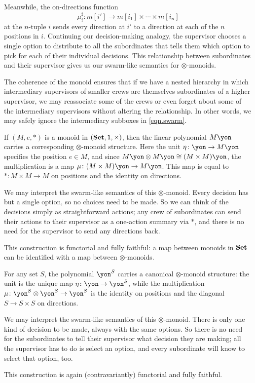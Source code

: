 \documentclass[Book-Poly]{subfiles}
\begin{document}
Meanwhile, the on-directions function
\[
    \mu^\sharp_{i} \colon m[i'] \to m[i_1]\times\cdots\times m[i_n]
\] 
at the $n$-tuple $i$ sends every direction at $i'$ to a direction at each of the $n$ positions in $i$.
Continuing our decision-making analogy, the supervisor chooses a single option to distribute to all the subordinates that tells them which option to pick for each of their individual decisions.
This relationship between subordinates and their supervisor gives us our swarm-like semantics for $\otimes$-monoids.

The coherence of the monoid ensures that if we have a nested hierarchy in which intermediary supervisors of smaller crews are themselves subordinates of a higher supervisor, we may reassociate some of the crews or even forget about some of the intermediary supervisors without altering the relationship.
In other words, we may safely ignore the intermediary subboxes in \eqref{eqn.swarm}.

\begin{example}\label{ex.tensor_monoid_linear}
If $(M,e,*)$ is a monoid in $(\mathbf{Set},\textsf{1},\times)$, then the linear polynomial $M\yon$ carries a corresponding $\otimes$-monoid structure.
Here the unit $\eta \colon \yon \to M\yon$ specifies the position $e \in M$, and since $M\yon \otimes M\yon \iso (M \times M)\yon$, the multiplication is a map $\mu \colon (M \times M)\yon \to M\yon$.
This map is equal to $* \colon M \times M \to M$ on positions and the identity on directions.

We may interpret the swarm-like semantics of this $\otimes$-monoid.
Every decision has but a single option, so no choices need to be made.
So we can think of the decisions simply as straightforward actions; any crew of subordinates can send their actions to their supervisor as a one-action summary via $*$, and there is no need for the supervisor to send any directions back.

This construction is functorial and fully faithful: a map between monoids in $\mathbf{Set}$ can be identified with a map between $\otimes$-monoids.
\end{example}

\begin{example}\label{ex.tensor_monoid_rep}
For any set $S$, the polynomial $\yon^S$ carries a canonical $\otimes$-monoid structure: the unit is the unique map $\eta\colon\yon\to\yon^S$, while the multiplication $\mu\colon\yon^S\otimes\yon^S\to\yon^S$ is the identity on positions and the diagonal $S\to S\times S$ on directions.

We may interpret the swarm-like semantics of this $\otimes$-monoid.
There is only one kind of decision to be made, always with the same options.
So there is no need for the subordinates to tell their supervisor what decision they are making; all the supervisor has to do is select an option, and every subordinate will know to select that option, too.

This construction is again (contravariantly) functorial and fully faithful.
\end{example}
\end{document}
